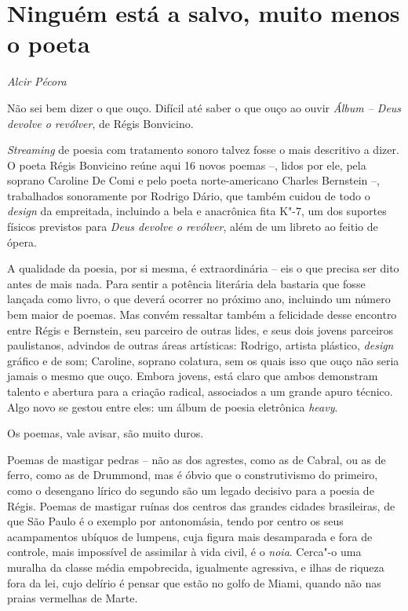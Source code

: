 \chapter*{Ninguém está a salvo, muito menos o poeta}

\begin{flushright}
\emph{Alcir Pécora}
\end{flushright}

Não sei bem dizer o que ouço. Difícil até saber o que ouço ao ouvir
\emph{Álbum -- Deus devolve o revólver}, de Régis Bonvicino.

\emph{Streaming} de poesia com tratamento sonoro talvez fosse o mais
descritivo a dizer. O poeta Régis Bonvicino reúne aqui 16 novos poemas
--, lidos por ele, pela soprano Caroline De Comi e pelo poeta
norte-americano Charles Bernstein --, trabalhados sonoramente por
Rodrigo Dário, que também cuidou de todo o \emph{design} da empreitada,
incluindo a bela e anacrônica fita K"-7, um dos suportes físicos
previstos para \emph{Deus devolve o revólver}, além de um libreto ao
feitio de ópera.

A qualidade da poesia, por si mesma, é extraordinária -- eis o que
precisa ser dito antes de mais nada. Para sentir a potência literária
dela bastaria que fosse lançada como livro, o que deverá ocorrer no
próximo ano, incluindo um número bem maior de poemas. Mas convém
ressaltar também a felicidade desse encontro entre Régis e Bernstein,
seu parceiro de outras lides, e seus dois jovens parceiros paulistanos,
advindos de outras áreas artísticas: Rodrigo, artista plástico,
\emph{design} gráfico e de som; Caroline, soprano colatura, sem os quais
isso que ouço não seria jamais o mesmo que ouço. Embora jovens, está
claro que ambos demonstram talento e abertura para a criação radical,
associados a um grande apuro técnico. Algo novo se gestou entre eles: um
álbum de poesia eletrônica \emph{heavy}.

Os poemas, vale avisar, são muito duros.

Poemas de mastigar pedras -- não as dos agrestes, como as de
Cabral, ou as de ferro, como as de Drummond, mas é óbvio que o
construtivismo do primeiro, como o desengano lírico do segundo são um
legado decisivo para a poesia de Régis. Poemas de mastigar ruínas dos
centros das grandes cidades brasileiras, de que São Paulo é o exemplo
por antonomásia, tendo por centro os seus acampamentos ubíquos de
lumpens, cuja figura mais desamparada e fora de controle, mais
impossível de assimilar à vida civil, é o \emph{noia}. Cerca"-o uma
muralha da classe média empobrecida, igualmente agressiva, e ilhas de
riqueza fora da lei, cujo delírio é pensar que estão no golfo de Miami,
quando não nas praias vermelhas de Marte.

